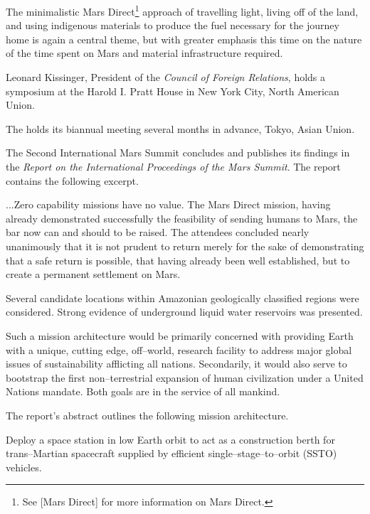 The minimalistic Mars Direct\footnote{See [Mars Direct] for more information on Mars Direct.} approach of travelling light, living off of the land, and using indigenous materials to produce the fuel necessary for the journey home is again a central theme, but with greater emphasis this time on the nature of the time spent on Mars and material infrastructure required.
\StopTimelineDate

Leonard Kissinger, President of the {\it Council of Foreign Relations}, holds a symposium at the Harold I. Pratt House in New York City, North American Union.
\StopTimelineDate

The  holds its biannual meeting several months in advance, Tokyo, Asian Union.
\StopTimelineDate

The Second International Mars Summit concludes and publishes its findings in the {\it Report on the International Proceedings of the Mars Summit}. The report contains the following excerpt.

\startTimelineGeneralDocument
...Zero capability missions have no value. The Mars Direct mission, having already demonstrated successfully the feasibility of sending humans to Mars, the bar now can and should to be raised. The attendees concluded nearly unanimously that it is not prudent to return merely for the sake of demonstrating that a safe return is possible, that having already been well established, but to create a permanent settlement on Mars. 

Several candidate locations within Amazonian geologically classified regions were considered. Strong evidence of underground liquid water reservoirs was presented.

Such a mission architecture would be primarily concerned with providing Earth with a unique, cutting edge, off--world, research facility to address major global issues of sustainability afflicting all nations. Secondarily, it would also serve to bootstrap the first non--terrestrial expansion of human civilization under a United Nations mandate. Both goals are in the service of all mankind.
\stopTimelineGeneralDocument

The report's abstract outlines the following mission architecture.

\startitemize[R]
\item Deploy a space station in low Earth orbit to act as a construction berth for trans--Martian spacecraft supplied by efficient single--stage--to--orbit (SSTO) vehicles.

